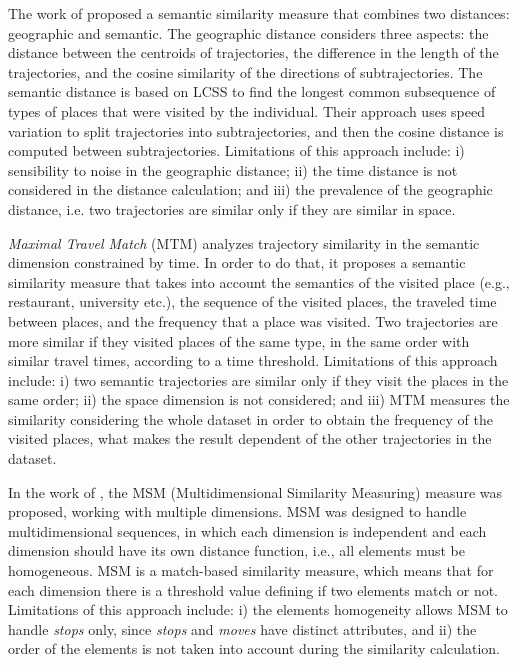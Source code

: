 The work of \cite{Liu:2012:SMM:2442968.2442971} proposed a semantic similarity measure that combines two distances: geographic and semantic. The geographic distance considers three aspects: the distance between the centroids of trajectories, the difference in the length of the trajectories, and the cosine similarity of the directions of subtrajectories. The semantic distance is based on LCSS to find the longest common subsequence of types of places that were visited by the individual. Their approach uses speed variation to split trajectories into subtrajectories, and then the cosine distance is computed between subtrajectories. Limitations of this approach include: i) sensibility to noise in the geographic distance; ii) the time distance is not considered in the distance calculation; and iii) the prevalence of the geographic distance, i.e. two trajectories are similar only if they are similar in space.

\emph{Maximal Travel Match} (MTM)\cite{Xiao:2010:FSU:1869790.1869857} analyzes trajectory similarity in the semantic dimension constrained by time. In order to do that, it proposes a semantic similarity measure that takes into account the semantics of the visited place (e.g., restaurant, university etc.), the sequence of the visited places, the traveled time between places, and the frequency that a place was visited. Two trajectories are more similar if they visited places of the same type, in the same order with similar travel times, according to a time threshold. Limitations of this approach include: i) two semantic trajectories are similar only if they visit the places in the same order; ii) the space dimension is not considered; and iii) MTM measures the similarity considering the whole dataset in order to obtain the frequency of the visited places, what makes the result dependent of the other trajectories in the dataset.

In the work of \cite{Furtado:TGIS12156}, the MSM (Multidimensional Similarity Measuring) measure was proposed, working with multiple dimensions. MSM was designed to handle multidimensional sequences, in which each dimension is independent and each dimension should have its own distance function, i.e., all elements must be homogeneous. MSM is a match-based similarity measure, which means that for each dimension there is a threshold value defining if two elements match or not. Limitations of this approach include: i) the elements homogeneity allows MSM to handle \textit{stops} only, since \textit{stops} and \textit{moves} have distinct attributes, and ii) the order of the elements is not taken into account during the similarity calculation.

